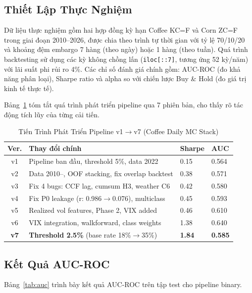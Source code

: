 \documentclass[conference]{IEEEtran}
\begin{document}
\subsection{Thiết Lập Thực Nghiệm}

Dữ liệu thực nghiệm gồm hai hợp đồng kỳ hạn Coffee KC=F và Corn ZC=F trong
giai đoạn 2010--2026, được chia theo trình tự thời gian với tỷ lệ 70/10/20 và
khoảng đệm embargo 7 hàng (theo ngày) hoặc 1 hàng (theo tuần). Quá trình
backtesting sử dụng các kỳ không chồng lấn (\texttt{iloc[::7]}, tương ứng 52
kỳ/năm) với lãi suất phi rủi ro 4\%. Các chỉ số đánh giá chính gồm: AUC-ROC
(đo khả năng phân loại), Sharpe ratio và alpha so với chiến lược Buy \& Hold
(đo giá trị kinh tế thực tế).

Bảng~\ref{tab:pipeline_evolution} tóm tắt quá trình phát triển pipeline qua
7 phiên bản, cho thấy rõ tác động tích lũy của từng cải tiến.

\begin{table}[t]
\caption{Tiến Trình Phát Triển Pipeline v1$\to$v7 (Coffee Daily MC Stack)}
\label{tab:pipeline_evolution}
\centering
\begin{tabular}{@{}clll@{}}
\toprule
\textbf{Ver.} & \textbf{Thay đổi chính} & \textbf{Sharpe} & \textbf{AUC} \\
\midrule
v1 & Pipeline ban đầu, threshold 5\%, data 2022 & 0.15 & 0.564 \\
v2 & Data 2010--, OOF stacking, fix overlap backtest & 0.38 & 0.571 \\
v3 & Fix 4 bugs: CCF lag, cumsum H3, weather C6 & 0.42 & 0.580 \\
v4 & Fix P0 leakage (r: 0.986$\to$0.076), multiclass & 0.45 & 0.593 \\
v5 & Realized vol features, Phase 2, VIX added & 0.46 & 0.610 \\
v6 & VIX integration, walkforward, class weights & 1.38 & 0.640 \\
\textbf{v7} & \textbf{Threshold 2.5\%} (base rate 18\%$\to$35\%) & \textbf{1.84} & \textbf{0.585} \\
\bottomrule
\end{tabular}
\end{table}

\subsection{Kết Quả AUC-ROC}

Bảng~\ref{tab:auc} trình bày kết quả AUC-ROC trên tập test cho pipeline binary.
\end{document}
